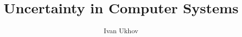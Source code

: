 \documentclass{thesis}
\title{Uncertainty in Computer Systems}
\author{Ivan Ukhov}
\begin{document}
\nocite{ukhov2012, ukhov2014a, ukhov2014b, ukhov2015, ukhov2017}








\printbibliography
\end{document}
